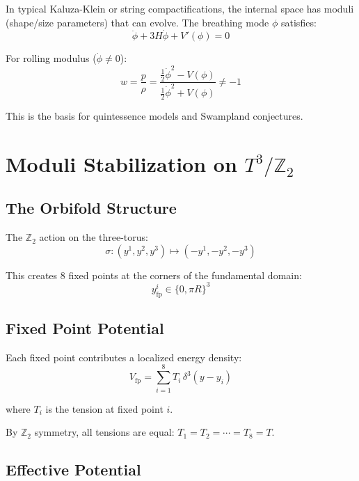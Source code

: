 \documentclass[12pt,a4paper]{article}
\begin{document}
In typical Kaluza-Klein or string compactifications, the internal space has moduli (shape/size parameters) that can evolve. The breathing mode $\phi$ satisfies:
\begin{equation}
\ddot{\phi} + 3H\dot{\phi} + V'(\phi) = 0
\end{equation}

For rolling modulus ($\dot{\phi} \neq 0$):
\begin{equation}
w = \frac{p}{\rho} = \frac{\frac{1}{2}\dot{\phi}^2 - V(\phi)}{\frac{1}{2}\dot{\phi}^2 + V(\phi)} \neq -1
\end{equation}

This is the basis for quintessence models and Swampland conjectures.

\section{Moduli Stabilization on $T^3/\mathbb{Z}_2$}

\subsection{The Orbifold Structure}

The $\mathbb{Z}_2$ action on the three-torus:
\begin{equation}
\sigma: (y^1, y^2, y^3) \mapsto (-y^1, -y^2, -y^3)
\end{equation}

This creates 8 fixed points at the corners of the fundamental domain:
\begin{equation}
y^i_{\text{fp}} \in \{0, \pi R\}^3
\end{equation}

\subsection{Fixed Point Potential}

Each fixed point contributes a localized energy density:
\begin{equation}
V_{\text{fp}} = \sum_{i=1}^{8} T_i \, \delta^3(y - y_i)
\end{equation}

where $T_i$ is the tension at fixed point $i$.

By $\mathbb{Z}_2$ symmetry, all tensions are equal: $T_1 = T_2 = \cdots = T_8 = T$.

\subsection{Effective Potential}
\end{document}

